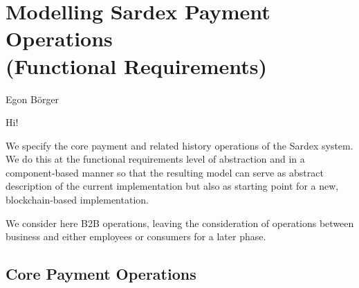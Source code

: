 \chapter{Modelling Sardex Payment Operations\\ (Functional Requirements)}
\label{ch:funreq}


\vspace{-1cm}
\begin{center}
Egon B\"orger
\end{center}


Hi!

\noindent{}
\vspace{12pt}

We specify the core payment and related history operations of the Sardex system. We do this at the functional requirements  level of abstraction and in a component-based manner so that the resulting model can serve as abstract description of the current implementation but also as starting point for a new, blockchain-based implementation.

We consider here B2B operations, leaving the consideration of operations between business and either employees or consumers for a later phase.

\section{Core Payment Operations}

